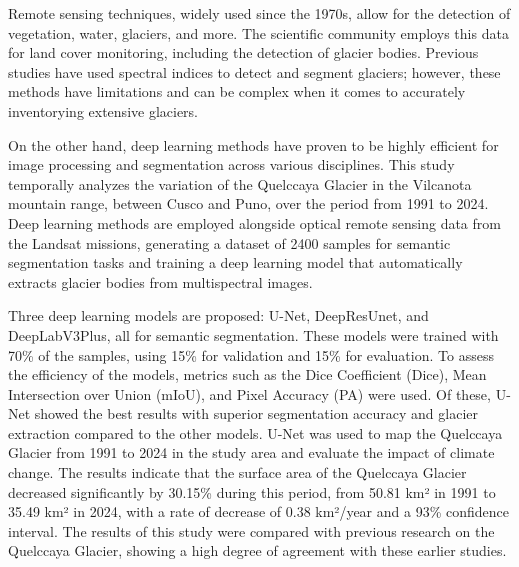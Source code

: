 Remote sensing techniques, widely used since the 1970s, allow for the detection of vegetation, water, glaciers, and more. The scientific community employs this data for land cover monitoring, including the detection of glacier bodies. Previous studies have used spectral indices to detect and segment glaciers; however, these methods have limitations and can be complex when it comes to accurately inventorying extensive glaciers.

On the other hand, deep learning methods have proven to be highly efficient for image processing and segmentation across various disciplines. This study temporally analyzes the variation of the Quelccaya Glacier in the Vilcanota mountain range, between Cusco and Puno, over the period from 1991 to 2024. Deep learning methods are employed alongside optical remote sensing data from the Landsat missions, generating a dataset of 2400 samples for semantic segmentation tasks and training a deep learning model that automatically extracts glacier bodies from multispectral images.

Three deep learning models are proposed: U-Net, DeepResUnet, and DeepLabV3Plus, all for semantic segmentation. These models were trained with 70\% of the samples, using 15\% for validation and 15\% for evaluation. To assess the efficiency of the models, metrics such as the Dice Coefficient (Dice), Mean Intersection over Union (mIoU), and Pixel Accuracy (PA) were used. Of these, U-Net showed the best results with superior segmentation accuracy and glacier extraction compared to the other models. U-Net was used to map the Quelccaya Glacier from 1991 to 2024 in the study area and evaluate the impact of climate change. The results indicate that the surface area of the Quelccaya Glacier decreased significantly by 30.15\% during this period, from 50.81 km² in 1991 to 35.49 km² in 2024, with a rate of decrease of 0.38 km²/year and a 93\% confidence interval. The results of this study were compared with previous research on the Quelccaya Glacier, showing a high degree of agreement with these earlier studies.

\singlespacing
